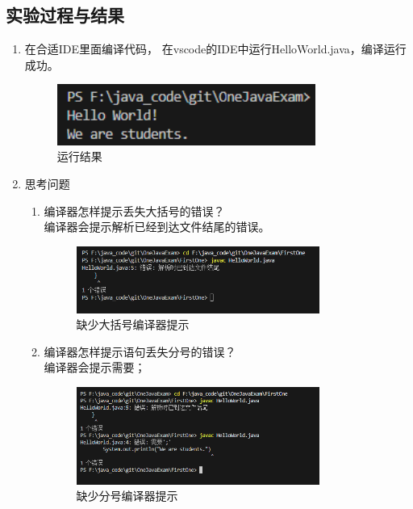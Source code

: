 \documentclass[12pt,a4paper]{article}
\begin{document}
\subsection*{实验过程与结果}
\begin{enumerate}
    \item 在合适IDE里面编译代码， 在vscode的IDE中运行HelloWorld.java，编译运行成功。
    \begin{figure}[H]
    \centering
    \includegraphics[width=0.8\textwidth]{run_jieguo.png}
    \caption{运行结果}
    \end{figure}
    \item 思考问题
    \begin{enumerate}
        \item 编译器怎样提示丢失大括号的错误？\\
        编译器会提示解析已经到达文件结尾的错误。
        \begin{figure}[H]
        \centering
        \includegraphics[width=0.8\textwidth]{question1.png}
        \caption{缺少大括号编译器提示}
        \end{figure}
        \item 编译器怎样提示语句丢失分号的错误？\\
        编译器会提示需要；
        \begin{figure}[H]
        \centering
        \includegraphics[width=0.8\textwidth]{question2.png}
        \caption{缺少分号编译器提示}
        \end{figure}

\end{enumerate}
\end{enumerate}
\end{document}
